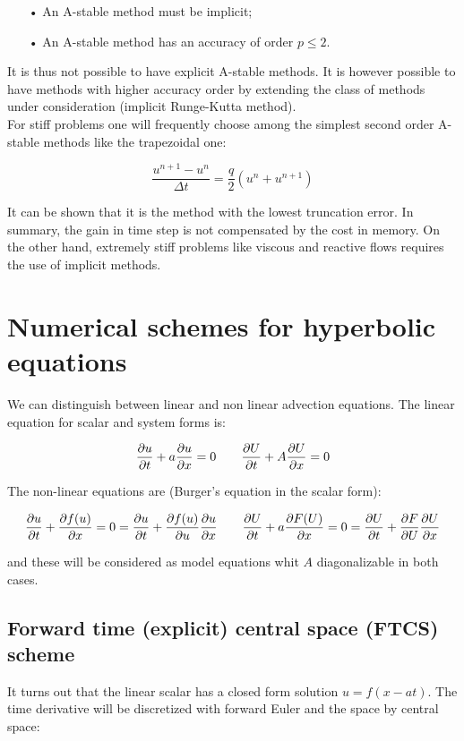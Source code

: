 \begin{itemize}
\item[•] An A-stable method must be implicit;
\item[•] An A-stable method has an accuracy of order $p\leq 2$.\\
\end{itemize} 

It is thus not possible to have explicit A-stable methods. It is however possible to have methods with higher accuracy order by extending the class of methods under consideration (implicit Runge-Kutta method).\\

For stiff problems one will frequently choose among the simplest second order A-stable methods like the trapezoidal one: 

\begin{equation}
\frac{u^{n+1} - u^n}{\Delta t} = \frac{q}{2} (u^n + u^{n+1})
\end{equation}

It can be shown that it is the method with the lowest truncation error. In summary, the gain in time step is not compensated by the cost in memory. On the other hand, extremely stiff problems like viscous and reactive flows requires the use of implicit methods. 

\section{Numerical schemes for hyperbolic equations}
We can distinguish between linear and non linear advection equations. The linear equation for scalar and system forms is:

\begin{equation}
\frac{\partial u}{\partial t} + a \frac{\partial u}{\partial x} = 0 \qquad \frac{\partial U}{\partial t} +A \frac{\partial U}{\partial x} = 0 
\end{equation}

The non-linear equations are (Burger's equation in the scalar form): 

\begin{equation}
\frac{\partial u}{\partial t} + \frac{\partial f( u)}{\partial x} = 0 = \frac{\partial u}{\partial t} + \frac{\partial f(u)}{\partial u} \frac{\partial u}{\partial x} \qquad \frac{\partial U}{\partial t} + a \frac{\partial F(U)}{\partial x} = 0 = \frac{\partial U }{\partial t} + \frac{\partial F}{\partial U} \frac{\partial U}{\partial x}
\end{equation}

and these will be considered as model equations whit $A$ diagonalizable in both cases. 

\subsection{Forward time (explicit) central space (FTCS) scheme}
It turns out that the linear scalar has a closed form solution $u = f(x-at)$. The time derivative will be discretized with forward Euler and the space by central space:

